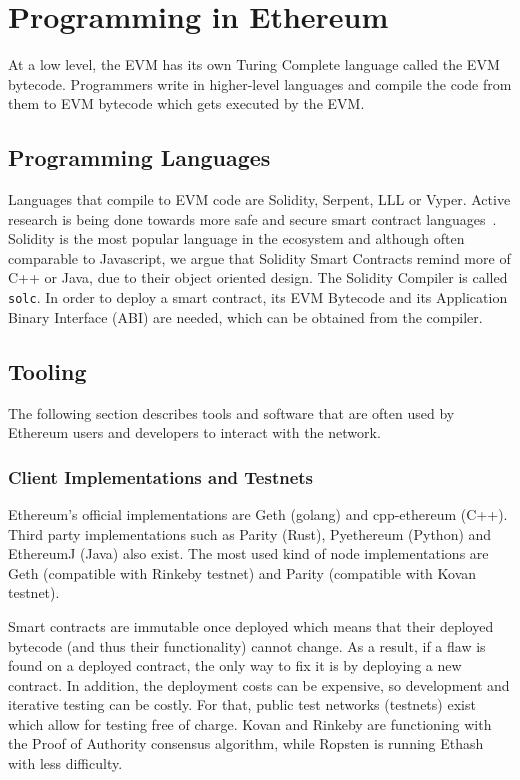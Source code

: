
\section{Programming in Ethereum}
At a low level, the EVM has its own Turing Complete language called the EVM bytecode. Programmers write in higher-level languages and compile the code from them to EVM bytecode which gets executed by the EVM\@.

\subsection{Programming Languages}
Languages that compile to EVM code are Solidity, Serpent, LLL or Vyper. Active research is being done towards more safe and secure smart contract languages~\cite{bamboo, flint}. Solidity is the most popular language in the ecosystem and although often comparable to Javascript, we argue that Solidity Smart Contracts remind more of C++ or Java, due to their object oriented design. The Solidity Compiler is called \texttt{solc}. In order to deploy a smart contract, its EVM Bytecode and its Application Binary Interface (ABI) are needed, which can be obtained from the compiler.



\subsection{Tooling}
The following section describes tools and software that are often used by Ethereum users and developers to interact with the network.

\subsubsection{Client Implementations and Testnets}
Ethereum's official implementations are Geth (golang) and cpp-ethereum (C++). Third party implementations such as Parity (Rust), Pyethereum (Python) and EthereumJ (Java) also exist. The most used kind of node implementations are Geth (compatible with Rinkeby testnet) and Parity (compatible with Kovan testnet). 

Smart contracts are immutable once deployed which means that their deployed bytecode (and thus their functionality) cannot change. As a result, if a flaw is found on a deployed contract, the only way to fix it is by deploying a new contract. In addition, the deployment costs can be expensive, so development and iterative testing can be costly. For that, public test networks (testnets) exist which allow for testing free of charge. Kovan and Rinkeby are functioning with the Proof of Authority \cite{poa} consensus algorithm, while Ropsten is running Ethash \cite{ethash} with less difficulty.

